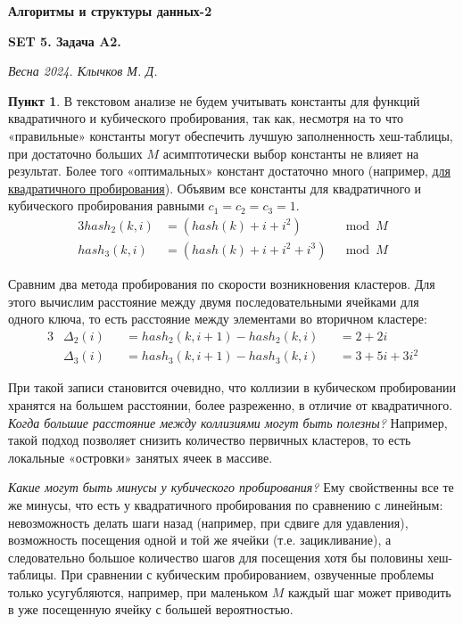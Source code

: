 \documentclass[11pt,a4paper]{scrarticle}
\author{Клычков Максим Дмитриевич}
\theoremstyle{definition}
\newtheorem{subtask}{Пункт}
\begin{document}
\centerline{\textbf{\huge Алгоритмы и структуры данных-2}}
\centerline{\textbf{SET 5. Задача A2.}}
\begin{flushright}
    \emph{Весна 2024. Клычков М. Д.}
\end{flushright}

\begin{subtask}
    В текстовом анализе не будем учитывать константы для функций квадратичного и кубического пробирования, так как, несмотря на то что «правильные» константы могут обеспечить лучшую заполненность хеш-таблицы, при достаточно больших $M$ асимптотически выбор константы не влияет на результат. Более того «оптимальных» констант достаточно много (например, \href{https://en.wikipedia.org/wiki/Quadratic_probing#Quadratic_function}{для квадратичного пробирования}). Объявим все константы для квадратичного и кубического пробирования равными $c_1 = c_2 = c_3 = 1$.
    \begin{alignat*}{3}
        hash_2(k, i) & = (hash(k) + i + i^2)       & \mod M \\
        hash_3(k, i) & = (hash(k) + i + i^2 + i^3) & \mod M
    \end{alignat*}


    Сравним два метода пробирования по скорости возникновения кластеров. %
    Для этого вычислим расстояние между двумя последовательными ячейками для одного ключа, то есть расстояние между элементами во вторичном кластере:
    \begin{alignat*}{3}
         & \Delta_2(i) &  & = hash_2(k, i + 1) - hash_2(k, i) &  & = 2 + 2i        \\
         & \Delta_3(i) &  & = hash_3(k, i + 1) - hash_3(k, i) &  & = 3 + 5i + 3i^2
    \end{alignat*}

    При такой записи становится очевидно, что коллизии в кубическом пробировании хранятся на большем расстоянии, более разреженно, в отличие от квадратичного. \textit{Когда большие расстояние между коллизиями могут быть полезны?} Например, такой подход позволяет снизить количество первичных кластеров, то есть локальные «островки» занятых ячеек в массиве.

    \textit{Какие могут быть минусы у кубического пробирования?} Ему свойственны все те же минусы, что есть у квадратичного пробирования по сравнению с линейным: невозможность делать шаги назад (например, при сдвиге для удавления), возможность посещения одной и той же ячейки (т.е. зацикливание), а следовательно большое количество шагов для посещения хотя бы половины хеш-таблицы. При сравнении с кубическим пробированием, озвученные проблемы только усугубляются, например, при маленьком $M$ каждый шаг может приводить в уже посещенную ячейку с большей вероятностью.
\end{subtask}
\end{document}
